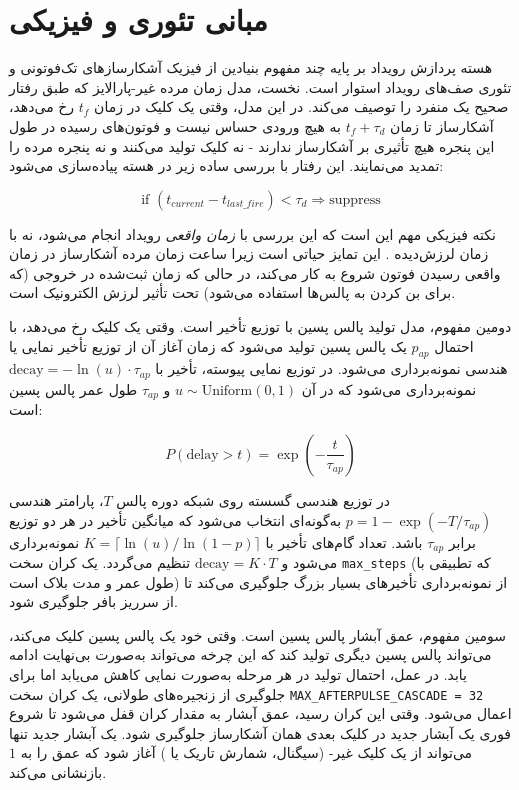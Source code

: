 \section{مبانی تئوری و فیزیکی}

هسته پردازش رویداد بر پایه چند مفهوم بنیادین از فیزیک آشکارسازهای تک‌فوتونی و تئوری صف‌های رویداد استوار است. نخست، مدل زمان مرده غیر-پارالایز  که طبق  رفتار صحیح یک  منفرد را توصیف می‌کند. در این مدل، وقتی یک کلیک در زمان $t_f$ رخ می‌دهد، آشکارساز تا زمان $t_f + \tau_d$ به هیچ ورودی حساس نیست و فوتون‌های رسیده در طول این پنجره هیچ تأثیری بر آشکارساز ندارند - نه کلیک تولید می‌کنند و نه پنجره مرده را تمدید می‌نمایند. این رفتار با بررسی ساده زیر در هسته پیاده‌سازی می‌شود:

\begin{equation}
	\text{if } (t_{current} - t_{last\_fire}) < \tau_d \Rightarrow \text{suppress}
\end{equation}

نکته فیزیکی مهم این است که این بررسی با \textit{زمان واقعی}  رویداد انجام می‌شود، نه با زمان لرزش‌دیده . این تمایز حیاتی است زیرا ساعت زمان مرده آشکارساز در زمان واقعی رسیدن فوتون شروع به کار می‌کند، در حالی که زمان ثبت‌شده در خروجی (که برای بن کردن به پالس‌ها استفاده می‌شود) تحت تأثیر لرزش الکترونیک است.

دومین مفهوم، مدل تولید پالس پسین  با توزیع تأخیر است. وقتی یک کلیک رخ می‌دهد، با احتمال $p_{ap}$ یک پالس پسین تولید می‌شود که زمان آغاز آن از توزیع تأخیر نمایی یا هندسی نمونه‌برداری می‌شود. در توزیع نمایی پیوسته، تأخیر با $\text{decay} = -\ln(u) \cdot \tau_{ap}$ نمونه‌برداری می‌شود که در آن $u \sim \text{Uniform}(0, 1)$ و $\tau_{ap}$ طول عمر پالس پسین است:

\begin{equation}
	P(\text{delay} > t) = \exp\left(-\frac{t}{\tau_{ap}}\right)
\end{equation}

در توزیع هندسی گسسته روی شبکه دوره پالس $T$، پارامتر هندسی $p = 1 - \exp(-T/\tau_{ap})$ به‌گونه‌ای انتخاب می‌شود که میانگین تأخیر در هر دو توزیع برابر $\tau_{ap}$ باشد. تعداد گام‌های تأخیر با $K = \lceil \ln(u) / \ln(1-p) \rceil$ نمونه‌برداری می‌شود و $\text{decay} = K \cdot T$ تنظیم می‌گردد. یک کران سخت \texttt{max\_steps} (که تطبیقی با طول عمر و مدت بلاک است) از نمونه‌برداری تأخیرهای بسیار بزرگ جلوگیری می‌کند تا از سرریز بافر  جلوگیری شود.

سومین مفهوم، عمق آبشار پالس پسین  است. وقتی خود یک پالس پسین کلیک می‌کند، می‌تواند پالس پسین دیگری تولید کند که این چرخه می‌تواند به‌صورت بی‌نهایت ادامه یابد. در عمل، احتمال تولید در هر مرحله به‌صورت نمایی کاهش می‌یابد اما برای جلوگیری از زنجیره‌های طولانی، یک کران سخت \texttt{MAX\_AFTERPULSE\_CASCADE = 32} اعمال می‌شود. وقتی این کران رسید، عمق آبشار به مقدار کران قفل می‌شود تا شروع فوری یک آبشار جدید در کلیک بعدی همان آشکارساز جلوگیری شود. یک آبشار جدید تنها می‌تواند از یک کلیک غیر- (سیگنال، شمارش تاریک یا ) آغاز شود که عمق را به $1$ بازنشانی می‌کند.

